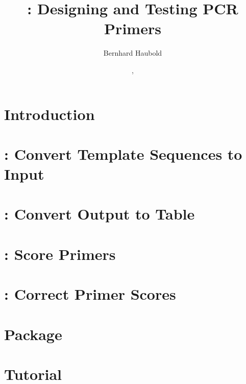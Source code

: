 \documentclass[a4paper]{report}
\begin{document}
\pagestyle{noweb}

\title{: Designing and Testing PCR Primers}
\author{Bernhard Haubold}
\date{\hspace{-0.11cm}, }
\maketitle

\tableofcontents

\chapter{Introduction}

\chapter{: Convert Template Sequences to  Input}

\chapter{: Convert  Output to Table}

\chapter{: Score Primers}

\chapter{: Correct Primer Scores}

\chapter{Package }

\chapter{Tutorial}



\end{document}
